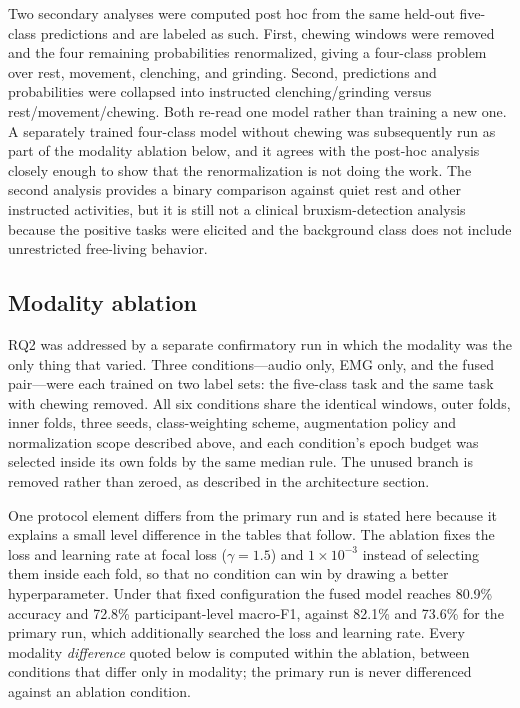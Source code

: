 \documentclass[pdflatex,sn-nature,iicol]{sn-jnl}
\begin{document}
Two secondary analyses were computed post hoc from the same held-out five-class predictions and are labeled as such. First, chewing windows were removed and the four remaining probabilities renormalized, giving a four-class problem over rest, movement, clenching, and grinding. Second, predictions and probabilities were collapsed into instructed clenching/grinding versus rest/movement/chewing. Both re-read one model rather than training a new one. A separately trained four-class model without chewing was subsequently run as part of the modality ablation below, and it agrees with the post-hoc analysis closely enough to show that the renormalization is not doing the work. The second analysis provides a binary comparison against quiet rest and other instructed activities, but it is still not a clinical bruxism-detection analysis because the positive tasks were elicited and the background class does not include unrestricted free-living behavior.

\subsection{Modality ablation}

RQ2 was addressed by a separate confirmatory run in which the modality was the only thing that varied. Three conditions---audio only, EMG only, and the fused pair---were each trained on two label sets: the five-class task and the same task with chewing removed. All six conditions share the identical windows, outer folds, inner folds, three seeds, class-weighting scheme, augmentation policy and normalization scope described above, and each condition's epoch budget was selected inside its own folds by the same median rule. The unused branch is removed rather than zeroed, as described in the architecture section.

One protocol element differs from the primary run and is stated here because it explains a small level difference in the tables that follow. The ablation fixes the loss and learning rate at focal loss ($\gamma = 1.5$) and $1\times10^{-3}$ instead of selecting them inside each fold, so that no condition can win by drawing a better hyperparameter. Under that fixed configuration the fused model reaches 80.9\% accuracy and 72.8\% participant-level macro-F1, against 82.1\% and 73.6\% for the primary run, which additionally searched the loss and learning rate. Every modality \emph{difference} quoted below is computed within the ablation, between conditions that differ only in modality; the primary run is never differenced against an ablation condition.
\end{document}
